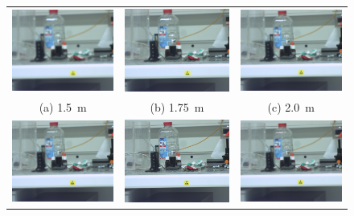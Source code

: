 \documentclass[
a4paper,     %
12pt         %
]{scrartcl}  %
\begin{document}
\begin{figure}
\centering
\begin{tabular}{ccc}
 \includegraphics[width=48mm]{./Bildg_Messtechnik_Lab/Autofokus/images/image_01_5.png} & \includegraphics[width=48mm]{./Bildg_Messtechnik_Lab/Autofokus/images/image_01_75.png} & \includegraphics[width=48mm]{./Bildg_Messtechnik_Lab/Autofokus/images/image_02_0.png}\\
(a) \SI{1.5}{m} & (b) \SI{1.75}{m} & (c) \SI{2.0}{m}\\[6pt]
 \includegraphics[width=48mm]{./Bildg_Messtechnik_Lab/Autofokus/images/image_02_5.png} & \includegraphics[width=48mm]{./Bildg_Messtechnik_Lab/Autofokus/images/image_03.png} & \includegraphics[width=48mm]{./Bildg_Messtechnik_Lab/Autofokus/images/image_04.png}\\

\end{tabular}
\end{figure}
\end{document}
